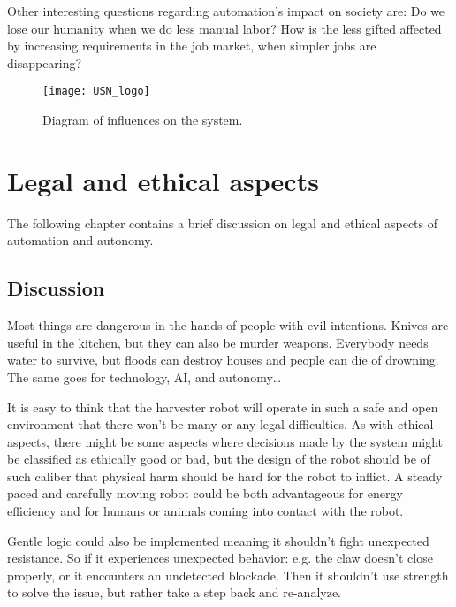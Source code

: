 \documentclass[%
oneside,    %
project,    %
nosummary   %
]{USN-MSc}
\begin{document}
Other interesting questions regarding automation's impact on society are:
Do we lose our humanity when we do less manual labor?
How is the less gifted affected by increasing requirements in the job market, when simpler jobs are disappearing?



\begin{figure}[!ht]
   \centering
  \texttt{[image: USN\_logo]}
  \caption{Diagram of influences on the system.}
  \label{fig:diagramInfluences}
\end{figure}


\chapter{Legal and ethical aspects}
\label{ch:legal}
The following chapter contains a brief discussion on legal and ethical aspects of automation and autonomy.

\section{Discussion}
\label{sec:legalEthicalAspects}

Most things are dangerous in the hands of people with evil intentions. Knives are useful in the kitchen,
but they can also be murder weapons. Everybody needs water to survive, but floods can destroy houses and people can die of drowning.
The same goes for technology, AI, and autonomy\dots

It is easy to think that the harvester robot will operate in such a safe and open environment that there won't be many or any legal difficulties.
As with ethical aspects, there might be some aspects where decisions made by the system might be classified as ethically good or bad,
but the design of the robot should be of such caliber that physical harm should be hard for the robot to inflict. 
A steady paced and carefully moving robot could be both advantageous for energy efficiency and for humans or animals coming into contact with the robot.

Gentle logic could also be implemented meaning it shouldn't fight unexpected resistance. 
So if it experiences unexpected behavior: e.g. the claw doesn't close properly, or it encounters an undetected blockade.
Then it shouldn't use strength to solve the issue, but rather take a step back and re-analyze.
\end{document}
